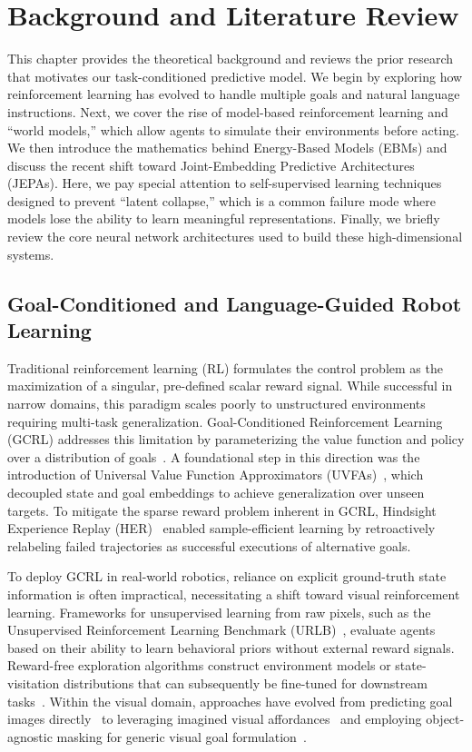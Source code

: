 \chapter{Background and Literature Review}
\label{sec:background}

This chapter provides the theoretical background and reviews the prior research that motivates our task-conditioned predictive model. We begin by exploring how reinforcement learning has evolved to handle multiple goals and natural language instructions. Next, we cover the rise of model-based reinforcement learning and ``world models,'' which allow agents to simulate their environments before acting. We then introduce the mathematics behind Energy-Based Models (EBMs) and discuss the recent shift toward Joint-Embedding Predictive Architectures (JEPAs). Here, we pay special attention to self-supervised learning techniques designed to prevent ``latent collapse,'' which is a common failure mode where models lose the ability to learn meaningful representations. Finally, we briefly review the core neural network architectures used to build these high-dimensional systems.

\section{Goal-Conditioned and Language-Guided Robot Learning}

Traditional reinforcement learning (RL) formulates the control problem as the maximization of a singular, pre-defined scalar reward signal. While successful in narrow domains, this paradigm scales poorly to unstructured environments requiring multi-task generalization. Goal-Conditioned Reinforcement Learning (GCRL) addresses this limitation by parameterizing the value function and policy over a distribution of goals~\cite{liu2022goal}. A foundational step in this direction was the introduction of Universal Value Function Approximators (UVFAs)~\cite{uvfa}, which decoupled state and goal embeddings to achieve generalization over unseen targets. To mitigate the sparse reward problem inherent in GCRL, Hindsight Experience Replay (HER)~\cite{her-rl} enabled sample-efficient learning by retroactively relabeling failed trajectories as successful executions of alternative goals.

To deploy GCRL in real-world robotics, reliance on explicit ground-truth state information is often impractical, necessitating a shift toward visual reinforcement learning. Frameworks for unsupervised learning from raw pixels, such as the Unsupervised Reinforcement Learning Benchmark (URLB)~\cite{urlb}, evaluate agents based on their ability to learn behavioral priors without external reward signals. Reward-free exploration algorithms construct environment models or state-visitation distributions that can subsequently be fine-tuned for downstream tasks~\cite{rewfree-rl, rfrl-linapp}. Within the visual domain, approaches have evolved from predicting goal images directly~\cite{nair2018visual, nair2020goal} to leveraging imagined visual affordances~\cite{khazatsky2021can} and employing object-agnostic masking for generic visual goal formulation~\cite{shahriar2025general}.

